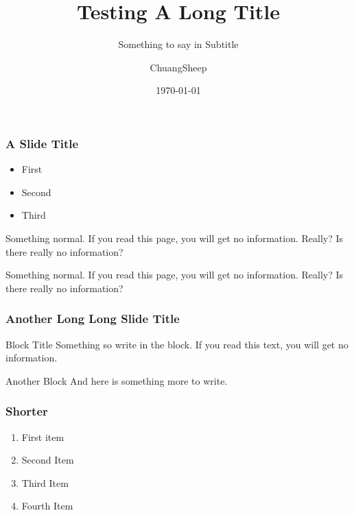 \documentclass[american,aspectratio=169]{beamer}
\title{Testing A Long Title}
\subtitle{Something to say in Subtitle}
\date{\today}
\author{ChuangSheep}
\begin{document}
\begin{frame} 
  \titlepage
\end{frame} 


\begin{iframe}
  \frametitle{A Slide Title}

  \begin{itemize}
    \item First
    \item Second 
    \item Third
  \end{itemize}

  Something normal. If you read this page, you will get no information. Really? Is there really no information?

  Something normal. If you read this page, you will get no information. Really? Is there really no information?
\end{iframe}

\begin{indentedframe}
  \frametitle{Another Long Long Slide Title}
  \begin{block}{Block Title}
    Something so write in the block. If you read this text, you will get no information. 
  \end{block}
  \begin{block}{Another Block}
    And here is something more to write. 
  \end{block}
\end{indentedframe}

\begin{indentedframe}
  \frametitle{Shorter}

  \begin{enumerate}
    \item First item
    \item Second Item
    \item Third Item
    \item Fourth Item
  \end{enumerate}
\end{indentedframe}

\end{document}
